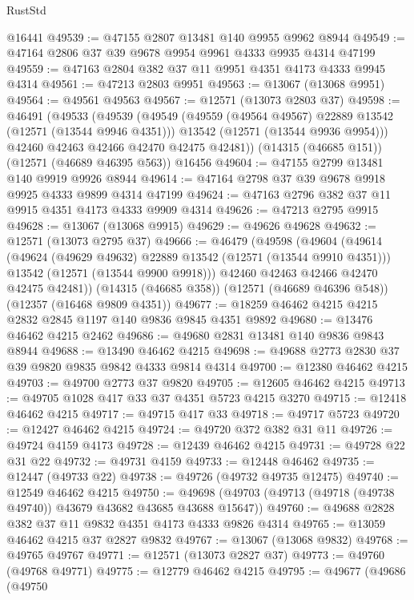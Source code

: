 \begin{lexlean}{RustStd}
\begin{coremodule}
    @16441
@49539 := @47155 @2807 @13481 @140 @9955 @9962 @8944
@49549 := @47164 @2806 @37 @39 @9678 @9954 @9961 @4333 @9935 @4314 @47199
@49559 := @47163 @2804 @382 @37 @11 @9951 @4351 @4173 @4333 @9945 @4314
@49561 := @47213 @2803 @9951
@49563 := @13067 (@13068 @9951)
@49564 := @49561 @49563
@49567 := @12571 (@13073 @2803 @37)
@49598 := @46491
    (@49533
      (@49539
        (@49549
          (@49559 (@49564 @49567) @22889 @13542 (@12571 (@13544 @9946 @4351)))
          @13542
          (@12571 (@13544 @9936 @9954)))
        @42460
        @42463
        @42466
        @42470
        @42475
        @42481))
    (@14315 (@46685 @151))
    (@12571 (@46689 @46395 @563))
    @16456
@49604 := @47155 @2799 @13481 @140 @9919 @9926 @8944
@49614 := @47164 @2798 @37 @39 @9678 @9918 @9925 @4333 @9899 @4314 @47199
@49624 := @47163 @2796 @382 @37 @11 @9915 @4351 @4173 @4333 @9909 @4314
@49626 := @47213 @2795 @9915
@49628 := @13067 (@13068 @9915)
@49629 := @49626 @49628
@49632 := @12571 (@13073 @2795 @37)
@49666 := @46479
    (@49598
      (@49604
        (@49614
          (@49624 (@49629 @49632) @22889 @13542 (@12571 (@13544 @9910 @4351)))
          @13542
          (@12571 (@13544 @9900 @9918)))
        @42460
        @42463
        @42466
        @42470
        @42475
        @42481))
    (@14315 (@46685 @358))
    (@12571 (@46689 @46396 @548))
    (@12357 (@16468 @9809 @4351))
@49677 := @18259 @46462 @4215 @4215 @2832 @2845 @1197 @140 @9836 @9845 @4351 @9892
@49680 := @13476 @46462 @4215 @2462
@49686 := @49680 @2831 @13481 @140 @9836 @9843 @8944
@49688 := @13490 @46462 @4215
@49698 := @49688 @2773 @2830 @37 @39 @9820 @9835 @9842 @4333 @9814 @4314
@49700 := @12380 @46462 @4215
@49703 := @49700 @2773 @37 @9820
@49705 := @12605 @46462 @4215
@49713 := @49705 @1028 @417 @33 @37 @4351 @5723 @4215 @3270
@49715 := @12418 @46462 @4215
@49717 := @49715 @417 @33
@49718 := @49717 @5723
@49720 := @12427 @46462 @4215
@49724 := @49720 @372 @382 @31 @11
@49726 := @49724 @4159 @4173
@49728 := @12439 @46462 @4215
@49731 := @49728 @22 @31 @22
@49732 := @49731 @4159
@49733 := @12448 @46462
@49735 := @12447 (@49733 @22)
@49738 := @49726 (@49732 @49735 @12475)
@49740 := @12549 @46462 @4215
@49750 := @49698 (@49703 (@49713 (@49718 (@49738 @49740)) @43679 @43682 @43685 @43688 @15647))
@49760 := @49688 @2828 @382 @37 @11 @9832 @4351 @4173 @4333 @9826 @4314
@49765 := @13059 @46462 @4215 @37 @2827 @9832
@49767 := @13067 (@13068 @9832)
@49768 := @49765 @49767
@49771 := @12571 (@13073 @2827 @37)
@49773 := @49760 (@49768 @49771)
@49775 := @12779 @46462 @4215
@49795 := @49677
    (@49686
      (@49750

\end{coremodule}
\end{lexlean}
